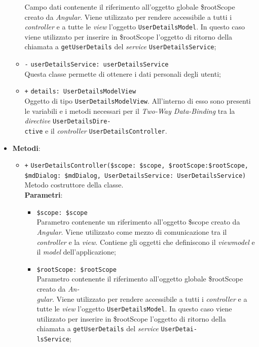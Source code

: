 \begin{itemize}
\begin{itemize}
		Campo dati contenente il riferimento all'oggetto globale \$rootScope creato da \textit{Angular}. Viene utilizzato per rendere accessibile a tutti i \textit{controller} e a tutte le \textit{view} l'oggetto \texttt{UserDetailsModel}. In questo caso viene utilizzato per inserire in \$rootScope l'oggetto di ritorno della chiamata a \texttt{getUserDetails} del \textit{service} \texttt{UserDetailsService};
		\item \texttt{-} \texttt{userDetailsService: userDetailsService} \\ Questa classe permette di ottenere i dati personali degli utenti;
		\item \texttt{+} \texttt{details: UserDetailsModelView} \\
		Oggetto di tipo \texttt{UserDetailsModelView}. All'interno di esso sono presenti le variabili e i metodi necessari per il \textit{Two-Way Data-Binding} tra la \textit{directive} \texttt{UserDetailsDire-\\ctive} e il \textit{controller} \texttt{UserDetailsController}.
	\end{itemize}	
		\item \textbf{Metodi}:
		\begin{itemize}
		\item \texttt{+} \texttt{UserDetailsController(\$scope: \$scope, \$rootScope:\$rootScope,\\ \$mdDialog: \$mdDialog, UserDetailsService: UserDetailsService)} \\ Metodo costruttore della classe.\\
		\textbf{Parametri}: 
		\begin{itemize}
			\item \texttt{\$scope: \$scope} \\
			Parametro contenente un riferimento all'oggetto \$scope creato da \textit{Angular}. Viene utilizzato come mezzo di comunicazione tra il \textit{controller} e la \textit{view}. Contiene gli oggetti che definiscono il \textit{viewmodel} e il \textit{model} dell'applicazione;
			\item \texttt{\$rootScope: \$rootScope} \\
			Parametro contenente il riferimento all'oggetto globale \$rootScope creato da \textit{An-\\gular{}}. Viene utilizzato per rendere accessibile a tutti i \textit{controller} e a tutte le \textit{view} l'oggetto \texttt{UserDetailsModel}. In questo caso viene utilizzato per inserire in \$rootScope l'oggetto di ritorno della chiamata a \texttt{getUserDetails} del \textit{service} \texttt{UserDetai-\\lsService};

\end{itemize}
\end{itemize}
\end{itemize}
